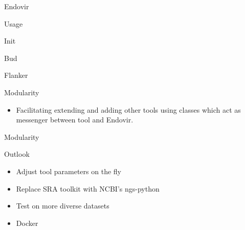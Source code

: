 \documentclass{beamer}
\begin{document}
  \begin{frame}{Endovir}
    \resizebox{\linewidth}{!}{}
  \end{frame}

  \begin{frame}{Usage}
    
  \end{frame}


  \begin{frame}{Init}
    \resizebox{\linewidth}{!}{}
  \end{frame}

  \begin{frame}{Bud}
    \resizebox{\linewidth}{!}{}
  \end{frame}

  \begin{frame}{Flanker}
    
  \end{frame}

  \begin{frame}{Modularity}
    \begin{itemize}
     \item Facilitating extending and adding other tools using classes
           which act as messenger between tool and Endovir.
    \end{itemize}
    
  \end{frame}

  \begin{frame}{Modularity}
    
  \end{frame}

  \begin{frame}{Outlook}
    \begin{itemize}
     \item Adjust tool parameters on the fly
     \item Replace SRA toolkit with NCBI's ngs-python
     \item Test on more diverse datasets
     \item Docker
    \end{itemize}
  \end{frame}
\end{document}
